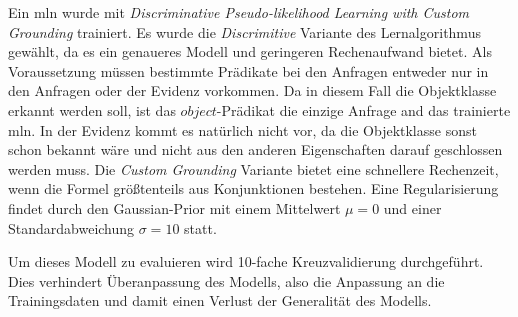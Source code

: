 Ein \gls{mln} wurde mit \textit{Discriminative Pseudo-likelihood Learning with Custom Grounding}   trainiert. Es wurde die \textit{Discrimitive} Variante des Lernalgorithmus gewählt, da es ein genaueres Modell und geringeren Rechenaufwand bietet. Als Voraussetzung müssen bestimmte Prädikate bei den Anfragen entweder nur in den Anfragen oder der Evidenz vorkommen. Da in diesem Fall die Objektklasse erkannt werden soll, ist das $object$-Prädikat die einzige Anfrage and das trainierte \gls{mln}. In der Evidenz kommt es natürlich nicht vor, da die Objektklasse sonst schon bekannt wäre und nicht aus den anderen Eigenschaften darauf geschlossen werden muss. Die \textit{Custom Grounding} Variante bietet eine schnellere Rechenzeit, wenn die Formel größtenteils aus Konjunktionen bestehen. Eine Regularisierung findet durch den Gaussian-Prior mit einem Mittelwert $\mu = 0$ und einer Standardabweichung $\sigma = 10$ statt. \par   
Um dieses Modell zu evaluieren wird 10-fache Kreuzvalidierung durchgeführt. Dies verhindert Überanpassung des Modells, also die Anpassung an die Trainingsdaten und damit einen Verlust der Generalität des Modells.

